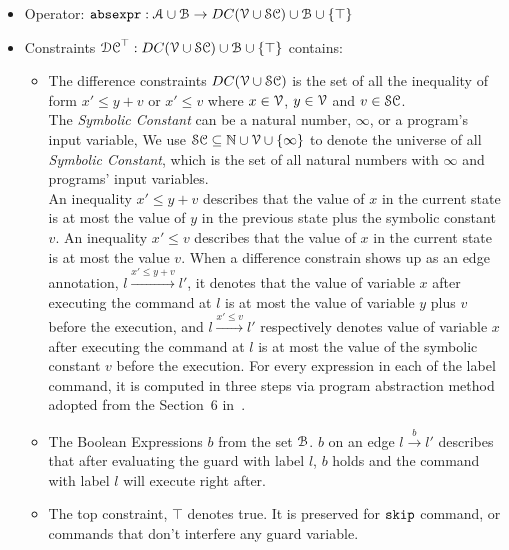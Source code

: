 \begin{itemize}
\item Operator: $\mathtt{abs}{\mathtt{expr}} : \mathcal{A} \cup \mathcal{B} \to DC(\mathcal{V}  \cup \mathcal{SC})\cup \mathcal{B} \cup \{\top\}$
%
\item Constraints $\mathcal{DC}^{\top}: DC(\mathcal{V}  \cup \mathcal{SC}) \cup \mathcal{B}\cup \{\top\}$  contains:
%
\begin{itemize}
\item The difference constraints $DC(\mathcal{V}  \cup \mathcal{SC})$ is the set of all the inequality of
form $x' \leq y + v$ or $x' \leq v$ where $x \in \mathcal{V} $, 
$y \in \mathcal{V}$ and $v \in \mathcal{SC}$.
\\
The \emph{Symbolic Constant} can be a natural number, $\infty$, or a program's input variable, We use $\mathcal{SC} \subseteq \mathbb{N} \cup \mathcal{V} \cup \{\infty \}$ to denote the universe of all \emph{Symbolic Constant},
which is the set of all natural numbers with $\infty$ and programs' input variables.
\\
An inequality $x' \leq y + v$ describes that the value of $x$ in the current state is
at most the value of $y$ in the previous state plus the symbolic constant $v$.
An inequality $x' \leq v$ describes that the value of $x$ in the current state is
at most the value $v$.
When a difference constrain shows up as an edge annotation, $l \xrightarrow{x' \leq y + v} l'$,
it denotes that
the value of variable $x$
after executing the command at $l$ is at most
the value of variable $y$ plus $v$ before the execution,
and $l \xrightarrow{x' \leq v} l'$ respectively denotes value of variable $x$
after executing the command at $l$ is at most
the value of the symbolic constant $v$ before the execution.
For every expression in each of the label command, it is computed in three steps via program abstraction method adopted from the Section~6 in~\cite{SinnZV17}. 
%
\item The Boolean Expressions $b$ from the set $\mathcal{B}$.
$b$ on an edge $l \xrightarrow{b} l'$ describes
that after evaluating the guard with label $l$,
$b$ holds and the command with label $l$ will execute right after.
%
\item The top constraint, $\top$ denotes true. It is preserved for $\mathtt{skip}$ command,
or commands that don't interfere any guard variable.
\end{itemize}
\end{itemize}

